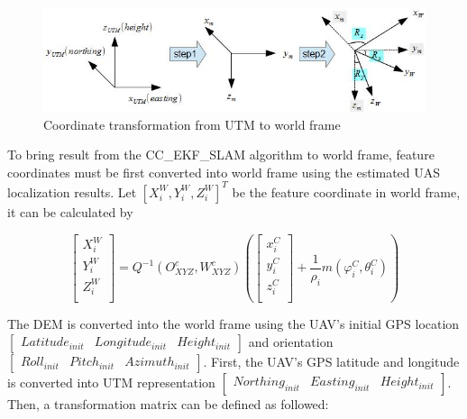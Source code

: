 \begin{figure}[h]
  \centering
  \includegraphics[width=12cm,keepaspectratio=true]{./Figures/utm_to_world.jpg}
  \caption{Coordinate transformation from UTM to world frame}
  \label{fig:utm_to_world}
\end{figure}

To bring result from the CC\_EKF\_SLAM algorithm to world frame, feature
coordinates must be first converted into world frame using the
estimated UAS localization results. Let $[X_i^W,Y_i^W, Z_i^W]^T$ be
the feature coordinate in world frame, it can be calculated by

\begin{equation}
  \left[ \begin{array}{c}
    X_{i}^{W}  \\
    Y_{i}^{W}  \\
    Z_{i}^{W}  \\
  \end{array} \right]=Q^{-1}(O_{XYZ}^{c}, W_{XYZ}^{c})\left(\left[
    \begin{array}{c}
      x_{i}^{C} \\
      y_{i}^{C} \\
      z_{i}^{C} \\
    \end{array}
  \right]+\frac{1}{\rho _{i}}m(\varphi _{i}^{C},\theta_{i}^{C})\right)
\end{equation}

The DEM is converted into the world frame using the UAV's initial GPS
location $[\begin{matrix} Latitude_{init} & Longitude_{init} &
  Height_{init} \end{matrix}]$ and orientation $[\begin{matrix}
  Roll_{init} & Pitch_{init } & Azimuth_{init} \end{matrix}]$. First,
the UAV's GPS latitude and longitude is converted into UTM
representation $[\begin{matrix} Northing_{init} & Easting_{init} &
  Height_{init} \end{matrix}]$. Then, a transformation matrix can be
defined as followed:


